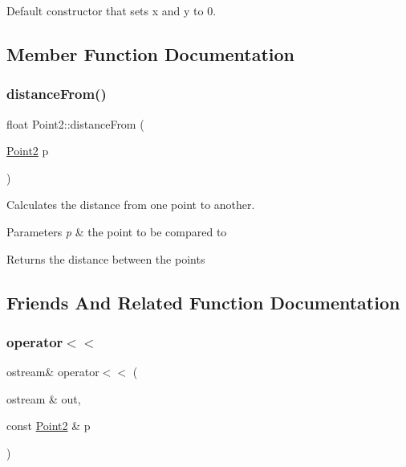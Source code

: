 Default constructor that sets x and y to 0. 



\subsection{Member Function Documentation}
\mbox{\label{class_point2_a39034c003b58aa1a4555445059b0ee47}} 
\subsubsection{\texorpdfstring{distanceFrom()}{distanceFrom()}}
{\footnotesize\ttfamily float Point2\+::distance\+From (\begin{DoxyParamCaption}\item[{\mbox{\hyperlink{class_point2}{Point2}}}]{p }\end{DoxyParamCaption})}



Calculates the distance from one point to another. 


\begin{DoxyParams}{Parameters}
{\em p} & the point to be compared to \\
\hline
\end{DoxyParams}
\begin{DoxyReturn}{Returns}
the distance between the points 
\end{DoxyReturn}


\subsection{Friends And Related Function Documentation}
\mbox{\label{class_point2_a58c9796662791cf4c9e78ab4825cfef9}} 
\subsubsection{\texorpdfstring{operator$<$$<$}{operator<<}}
{\footnotesize\ttfamily ostream\& operator$<$$<$ (\begin{DoxyParamCaption}\item[{ostream \&}]{out,  }\item[{const \mbox{\hyperlink{class_point2}{Point2}} \&}]{p }\end{DoxyParamCaption})\hspace{0.3cm}{\ttfamily [friend]}}



